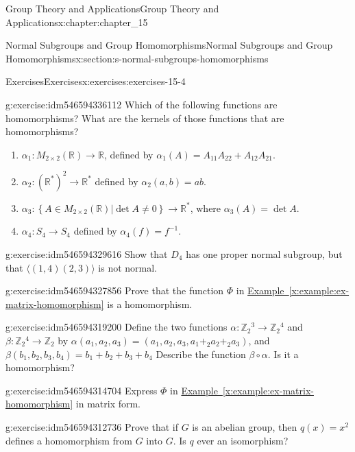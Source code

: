 \documentclass[oneside,10pt,]{book}
\newcommand{\xreffont}{\relax}
\numberwithin{equation}{section}
\begin{document}
\begin{chapterptx}{Group Theory and Applications}{}{Group Theory and Applications}{}{}{x:chapter:chapter_15}
\begin{sectionptx}{Normal Subgroups and Group Homomorphisms}{}{Normal Subgroups and Group Homomorphisms}{}{}{x:section:s-normal-subgroups-homomorphisms}
\begin{exercises-subsection}{Exercises}{}{Exercises}{}{}{x:exercises:exercises-15-4}
\begin{divisionexercise}{2}{}{}{g:exercise:idm546594336112}
Which of the following functions are homomorphisms? What are the kernels of those functions that are homomorphisms?%
\begin{enumerate}[label=(\alph*)]
\item{}\(\alpha_1: M_{2\times 2}(\mathbb{R}) \rightarrow  \mathbb{R}\), defined by \(\alpha_1(A) = A_{11} A_{22} + A_{12} A_{21}\).%
\item{}\(\alpha_2 : \left(\mathbb{R}^*\right)^2 \rightarrow \mathbb{R}^*\) defined by \(\alpha_2 (a, b) = a b\).%
\item{}\(\alpha_3 : \left\{\left.A \in  M_{2\times 2}(\mathbb{R}) \right| \det  A \neq  0\right\} \to  \mathbb{R}^*\), where \(\alpha_3(A) = \det
A\).%
\item{}\(\alpha_4 : S_4\rightarrow  S_4\)  defined by \(\alpha_4(f)=f^{-1}\).%
\end{enumerate}
%
\end{divisionexercise}%
\begin{divisionexercise}{3}{}{}{g:exercise:idm546594329616}%
Show that \(D_4\) has one proper normal subgroup, but that \(\langle (1,4)(2,3)\rangle\) is not normal.%
\end{divisionexercise}%
\begin{divisionexercise}{4}{}{}{g:exercise:idm546594327856}%
Prove that the function \(\Phi\) in \hyperref[x:example:ex-matrix-homomorphism]{Example~{\xreffont\ref{x:example:ex-matrix-homomorphism}}} is a homomorphism.%
\end{divisionexercise}%
\begin{divisionexercise}{5}{}{}{g:exercise:idm546594319200}%
Define the two functions  \(\alpha: \mathbb{Z}_2{}^3\rightarrow  \mathbb{Z}_2{}^4\)  and \(\beta :\mathbb{Z}_2{}^4\to \mathbb{Z}_2\) by \(\alpha\left(a_1,a_2,a_3 \right) = \left(a_1,a_2,a_3 ,a_1+_2 a_2+_2a_3\right)\), and \(\beta \left(b_1,b_2,b_3,b_4\right)=b_1+b_2+b_3+b_4\) Describe the function \(\beta \circ \alpha\). Is it a homomorphism?%
\end{divisionexercise}%
\begin{divisionexercise}{6}{}{}{g:exercise:idm546594314704}%
Express \(\Phi\) in \hyperref[x:example:ex-matrix-homomorphism]{Example~{\xreffont\ref{x:example:ex-matrix-homomorphism}}} in matrix form.%
\end{divisionexercise}%
\begin{divisionexercise}{7}{}{}{g:exercise:idm546594312736}%
Prove that if \(G\) is an abelian group, then \(q(x) = x^2\) defines a homomorphism from \(G\) into \(G\).  Is \(q\) ever an isomorphism?%

\end{divisionexercise}
\end{exercises-subsection}
\end{sectionptx}
\end{chapterptx}
\end{document}
